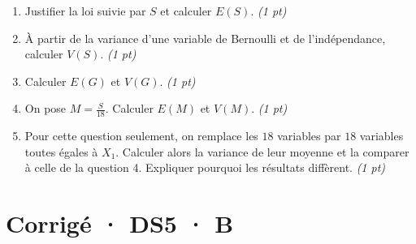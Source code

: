 \begin{enumerate}

\item Justifier la loi suivie par $S$ et calculer $E(S)$. \hfill\textit{(1 pt)}

\item À partir de la variance d'une variable de Bernoulli et de l'indépendance, calculer $V(S)$. \hfill\textit{(1 pt)}

\item Calculer $E(G)$ et $V(G)$. \hfill\textit{(1 pt)}

\item On pose $M=\frac S{18}$. Calculer $E(M)$ et $V(M)$. \hfill\textit{(1 pt)}

\item Pour cette question seulement, on remplace les $18$ variables par $18$ variables toutes égales à $X_1$. Calculer alors la variance de leur moyenne et la comparer à celle de la question 4. Expliquer pourquoi les résultats diffèrent. \hfill\textit{(1 pt)}

\end{enumerate}

\ifmxteacher\mxnewpage

\section*{Corrigé · DS5 · B}\label{cor:7-4}

